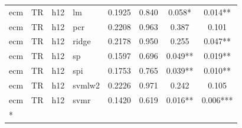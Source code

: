 \begin{ThreePartTable}
\begin{longtable}[t]{llclcccc}
ecm & TR & h12 & lm & 0.1925 & 0.840 & 0.058* & 0.014**\\
ecm & TR & h12 & pcr & 0.2208 & 0.963 & 0.387 & 0.101\\
ecm & TR & h12 & ridge & 0.2178 & 0.950 & 0.255 & 0.047**\\
ecm & TR & h12 & sp & 0.1597 & 0.696 & 0.049** & 0.019**\\
ecm & TR & h12 & spi & 0.1753 & 0.765 & 0.039** & 0.010**\\
ecm & TR & h12 & svmlw2 & 0.2226 & 0.971 & 0.242 & 0.105\\
ecm & TR & h12 & svmr & 0.1420 & 0.619 & 0.016** & 0.006***\\*
\end{longtable}
\end{ThreePartTable}
\endgroup{}
